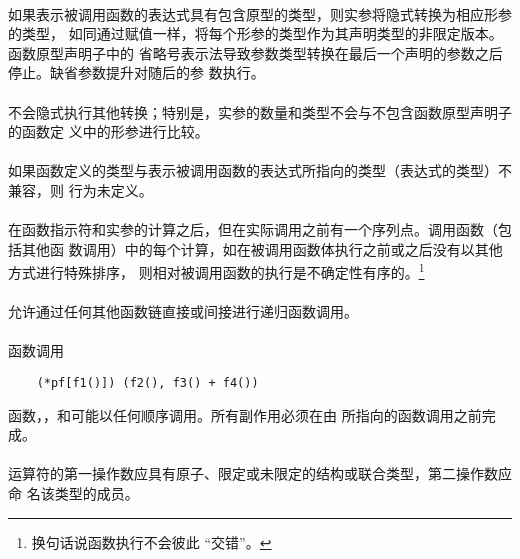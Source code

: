 {\paragraph{}
如果表示被调用函数的表达式具有包含原型的类型，则实参将隐式转换为相应形参的类型，
如同通过赋值一样，将每个形参的类型作为其声明类型的非限定版本。函数原型声明子中的
省略号表示法导致参数类型转换在最后一个声明的参数之后停止。缺省参数提升对随后的参
数执行。

\paragraph{}
不会隐式执行其他转换；特别是，实参的数量和类型不会与不包含函数原型声明子的函数定
义中的形参进行比较。

\paragraph{}
如果函数定义的类型与表示被调用函数的表达式所指向的类型（表达式的类型）不兼容，则
行为未定义。

\paragraph{}
在函数指示符和实参的计算之后，但在实际调用之前有一个序列点。调用函数（包括其他函
数调用）中的每个计算，如在被调用函数体执行之前或之后没有以其他方式进行特殊排序，
则相对被调用函数的执行是不确定性有序的。\footnote{换句话说函数执行不会彼此
``交错''。}

\paragraph{}
允许通过任何其他函数链直接或间接进行递归函数调用。

\paragraph{}
\ex* 函数调用
\begin{lstlisting}
    (*pf[f1()]) (f2(), f3() + f4())
\end{lstlisting}
函数，，和可能以任何顺序调用。所有副作用必须在由
所指向的函数调用之前完成。


\constraint
\paragraph{}
运算符的第一操作数应具有原子、限定或未限定的结构或联合类型，第二操作数应命
名该类型的成员。

}
